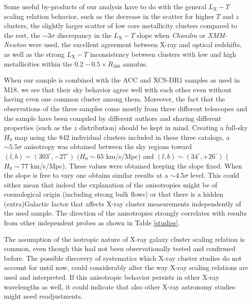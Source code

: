\documentclass{aa}   %
\begin{document}
Some useful by-products of our analysis have to do with the general $L_{\text{X}}-T$ scaling relation behavior, such as the decrease in the scatter for higher $T$ and $z$ clusters, the slightly larger scatter of low core metallicity clusters compared to the rest, the $\sim 3\sigma$ discrepancy in the $L_{\text{X}}-T$ slope when \textit{Chandra} or \textit{XMM-Newton} were used, the excellent agreement between X-ray and optical redshifts, as well as the strong $L_{\text{X}}-T$ inconsistency between clusters with low and high metallicities within the $0.2-0.5\times R_{500}$ annulus.

When our sample is combined with the ACC and XCS-DR1 samples as used in M18, we see that their sky behavior agree well with each other even without having even one common cluster among them. Moreover, the fact that the observations of the three samples come mostly from three different telescopes and the sample have been compiled by different authors and sharing different properties (such as the $z$ distribution) should be kept in mind. Creating a full-sky $H_0$ map using the 842 individual clusters included in these three catalogs, a $\sim 5.5\sigma$ anisotropy was obtained between the sky regions toward $(l,b)\sim (303^{\circ}, -27^{\circ})$ ($H_0\sim 65$ km/s/Mpc) and $(l,b)\sim (34^{\circ}, +26^{\circ})$ ($H_0\sim 77$ km/s/Mpc). These values were obtained keeping the slope fixed. When the slope is free to vary one obtains similar results at a $\sim 4.5\sigma$ level. This could either mean that indeed the explanation of the anisotropies might be of cosmological origin (including strong bulk flows) or that there is a hidden (extra)Galactic factor that affects X-ray cluster measurements independently of the used sample. The direction of the anisotropies strongly correlates with results from other independent probes as shown in Table \ref{studies}.

The assumption of the isotropic nature of X-ray galaxy cluster scaling relation is common, even though this had not been observationally tested and confirmed before. The possible discovery of systematics which X-ray cluster studies do not account for until now, could considerably alter the way X-ray scaling relations are used and interpreted. If this anisotropic behavior persists in other X-ray wavelengths as well, it could indicate that also other X-ray astronomy studies might need readjustments.
\end{document}
